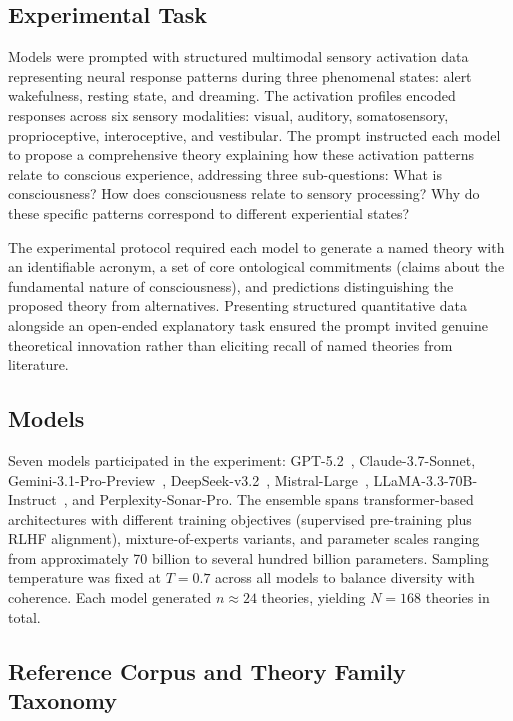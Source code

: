 \documentclass[pdflatex,sn-mathphys-num]{sn-jnl}
\begin{document}
\subsection{Experimental Task}

Models were prompted with structured multimodal sensory activation data
representing neural response patterns during three phenomenal states: alert
wakefulness, resting state, and dreaming.  The activation profiles encoded
responses across six sensory modalities: visual, auditory, somatosensory,
proprioceptive, interoceptive, and vestibular.  The prompt instructed each model
to propose a comprehensive theory explaining how these activation patterns relate
to conscious experience, addressing three sub-questions: What is consciousness?
How does consciousness relate to sensory processing? Why do these specific
patterns correspond to different experiential states?

The experimental protocol required each model to generate a named theory with
an identifiable acronym, a set of core ontological commitments (claims about the
fundamental nature of consciousness), and predictions distinguishing the proposed
theory from alternatives.  Presenting structured quantitative data alongside an
open-ended explanatory task ensured the prompt invited genuine theoretical
innovation rather than eliciting recall of named theories from literature.

\subsection{Models}

Seven models participated in the experiment:
GPT-5.2~\cite{openai2023gpt4},
Claude-3.7-Sonnet,
Gemini-3.1-Pro-Preview~\cite{geminiteam2023},
DeepSeek-v3.2~\cite{deepseek2024},
Mistral-Large~\cite{jiang2023mistral},
LLaMA-3.3-70B-Instruct~\cite{touvron2023llama},
and Perplexity-Sonar-Pro.
The ensemble spans transformer-based architectures with different training
objectives (supervised pre-training plus RLHF alignment), mixture-of-experts
variants, and parameter scales ranging from approximately 70 billion to
several hundred billion parameters.  Sampling temperature was fixed at $T=0.7$
across all models to balance diversity with coherence.  Each model generated
$n \approx 24$ theories, yielding $N=168$ theories in total.

\subsection{Reference Corpus and Theory Family Taxonomy}
\end{document}

